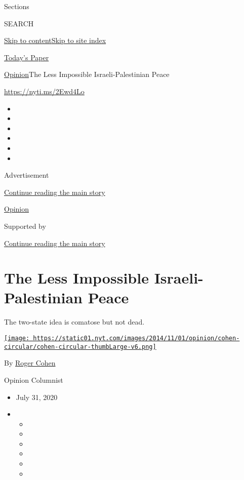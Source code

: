 Sections

SEARCH

\protect\hyperlink{site-content}{Skip to
content}\protect\hyperlink{site-index}{Skip to site index}

\href{https://myaccount.nytimes.com/auth/login?response_type=cookie\&client_id=vi}{}

\href{https://www.nytimes.com/section/todayspaper}{Today's Paper}

\href{/section/opinion}{Opinion}\textbar{}The Less Impossible
Israeli-Palestinian Peace

\href{https://nyti.ms/2Ewd4Lo}{https://nyti.ms/2Ewd4Lo}

\begin{itemize}
\item
\item
\item
\item
\item
\item
\end{itemize}

Advertisement

\protect\hyperlink{after-top}{Continue reading the main story}

\href{/section/opinion}{Opinion}

Supported by

\protect\hyperlink{after-sponsor}{Continue reading the main story}

\hypertarget{the-less-impossible-israeli-palestinian-peace}{%
\section{The Less Impossible Israeli-Palestinian
Peace}\label{the-less-impossible-israeli-palestinian-peace}}

The two-state idea is comatose but not dead.

\href{https://www.nytimes.com/by/roger-cohen}{\texttt{[image: https://static01.nyt.com/images/2014/11/01/opinion/cohen-circular/cohen-circular-thumbLarge-v6.png]}}

By \href{https://www.nytimes.com/by/roger-cohen}{Roger Cohen}

Opinion Columnist

\begin{itemize}
\item
  July 31, 2020
\item
  \begin{itemize}
  \item
  \item
  \item
  \item
  \item
  \item
  \end{itemize}
\end{itemize}

